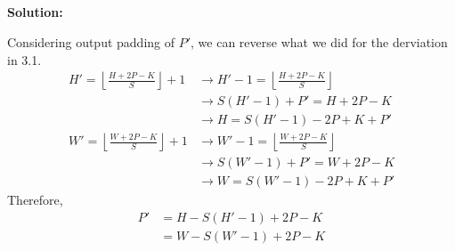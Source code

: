 \documentclass{article}
\newenvironment{solution}
  {\par\noindent\textbf{Solution:}\par}
  {\par}
\begin{document}
\subsection{}
\begin{solution}
  Considering output padding of $P'$, we can reverse what we did for the derviation in 3.1.
  \[
  \begin{aligned}
    H' = \left\lfloor \frac{H + 2P  - K}{S} \right\rfloor + 1 &\to H' - 1 = \left\lfloor \frac{H + 2P  - K}{S} \right\rfloor \\ 
                                                              &\to S(H'-1) + P' = H + 2P - K \\ 
                                                              &\to H = S(H'-1) -2P + K + P' \\ 
  W' = \left\lfloor \frac{W + 2P  - K}{S} \right\rfloor + 1 &\to W' - 1 = \left\lfloor \frac{W + 2P  - K}{S} \right\rfloor \\ 
                                                              &\to S(W'-1) + P' = W + 2P - K \\ 
                                                              &\to W = S(W'-1) -2P + K + P'
  \end{aligned}
\]
Therefore, 
\[
  \begin{aligned}
    P' &= H - S(H'-1)+2P-K \\
       &= W - S(W'-1)+2P-K   \end{aligned}
\]
\end{solution}
\end{document}
